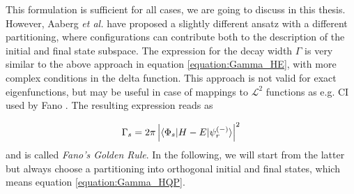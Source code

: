 This formulation is sufficient for all cases, we are going to discuss in this thesis.
However, Aaberg \textit{et al.} have proposed a slightly different ansatz with
a different partitioning, where configurations can contribute both to the description
of the initial and final state subspace. The expression for the decay width $\Gamma$
is very similar to the above approach in equation \ref{equation:Gamma_HE}, with more
complex conditions in the delta function.\cite{Aaberg82} This approach is not valid for exact
eigenfunctions, but may be useful in case of mappings to $\mathcal{L}^2$ functions as
e.g. \ac{CI} used by Fano \cite{Fano61}. The resulting expression reads as

\begin{equation}
  \Gamma_s = 2 \pi \left| \braket{\Phi_s|H-E|\psi_r^{(-)}} \right| ^2
\end{equation}
and is called \emph{Fano's Golden Rule}. In the following, we will start from
the latter but always choose a partitioning into orthogonal initial and final
states, which means equation \ref{equation:Gamma_HQP}.
